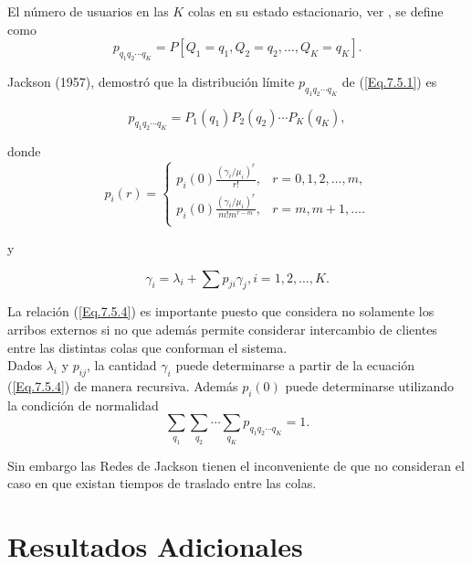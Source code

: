 \documentclass{article}
\numberwithin{equation}{section}
\begin{document}
El n\'umero de usuarios en las $K$ colas en su estado estacionario, ver \cite{Bhat}, se define como
\begin{equation}\label{Eq.7.5.1}
p_{q_{1}q_{2}\cdots
q_{K}}=P\left[Q_{1}=q_{1},Q_{2}=q_{2},\ldots,Q_{K}=q_{K}\right].
\end{equation}

Jackson (1957), demostr\'o que la distribuci\'on l\'imite
$p_{q_{1}q_{2}\cdots q_{K}}$ de (\ref{Eq.7.5.1}) es

\begin{equation}\label{Eq.7.5.2}
p_{q_{1}q_{2}\cdots
q_{K}}=P_{1}\left(q_{1}\right)P_{2}\left(q_{2}\right)\cdots
P_{K}\left(q_{K}\right),
\end{equation}

donde
\begin{equation}\label{Eq.7.5.3}
p_{i}\left(r\right)=\left\{\begin{array}{cc}
 p_{i}\left(0\right)\frac{\left(\gamma_{i}/\mu_{i}\right)^{r}}{r!},  & r=0,1,2,\ldots,m, \\
 p_{i}\left(0\right)\frac{\left(\gamma_{i}/\mu_{i}\right)^{r}}{m!m^{r-m}}, & r=m,m+1,\ldots .\\
\end{array}\right.
\end{equation}

y

\begin{equation}\label{Eq.7.5.4}
\gamma_{i}=\lambda_{i}+\sum p_{ji}\gamma_{j},\textrm{
}i=1,2,\ldots,K.
\end{equation}

La relaci\'on (\ref{Eq.7.5.4}) es importante puesto que considera no solamente los arribos externos si no que adem\'as permite considerar intercambio de clientes entre las distintas colas que conforman el sistema.\\

Dados $\lambda_{i}$ y $p_{ij}$, la cantidad $\gamma_{i}$ puede determinarse a partir de la ecuaci\'on (\ref{Eq.7.5.4}) de manera recursiva. Adem\'as $p_{i}\left(0\right)$ puede determinarse utilizando la condici\'on de normalidad
\[\sum_{q_{1}}\sum_{q_{2}}\cdots\sum_{q_{K}}p_{q_{1}q_{2}\cdots q_{K}}=1.\]

Sin embargo las Redes de Jackson tienen el inconveniente de que no consideran el caso en que existan tiempos de traslado entre las colas. 



\section{Resultados Adicionales}
\end{document}
